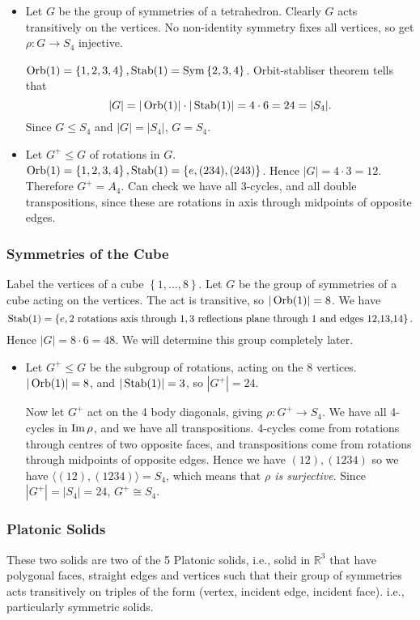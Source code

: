 \documentclass[a4paper]{article}
\begin{document}
\begin{itemize}
  \item Let $G$ be the group of symmetries of a tetrahedron. Clearly
    $G$ acts transitively on the vertices. No non-identity symmetry
    fixes all vertices, so get $ \rho:G \to S_4 $ injective.

    $ \operatorname{Orb}(1)=\left\{ 1,2,3,4 \right\}, \operatorname{Stab}(1)=\operatorname{Sym}\left\{ 2,3,4
    \right\} $. Orbit-stabliser theorem tells that
    \[
      |G|=|\operatorname{Orb}(1)|\cdot |\operatorname{Stab}(1)| = 4\cdot 6 = 24 = |S_4|
    .\]
    Since $ G \le S_4 $ and $ |G|=|S_4| $, $ G=S_4 $.
  \item Let $ G^+\le G $ of rotations in $G$. $ \operatorname{Orb}(1)=\left\{
    1,2,3,4 \right\}, \operatorname{Stab}(1)=\left\{ e, (234),(243) \right\} $.
    Hence $ |G|=4\cdot 3 = 12 $. Therefore $ G^+=A_4 $. Can check we
    have all 3-cycles, and all double transpositions, since these are
    rotations in axis through midpoints of opposite edges.
\end{itemize}
\subsubsection{Symmetries of the Cube}
Label the vertices of a cube $ \left\{ 1,\dots,8 \right\} $. Let $G$
be the group of symmetries of a cube acting on the vertices. The act
is transitive, so $ |\operatorname{Orb}(1)|=8 $. We have
\[
  \operatorname{Stab}(1)=\left\{ e,\text{2 rotations axis through 1}, \text{3
  reflections plane through 1 and edges 12,13,14} \right\}
.\]
Hence $ |G|=8\cdot 6=48. $ We will determine this group completely later.
\begin{itemize}
  \item Let $ G^+ \le G$ be the subgroup of rotations, acting on the
    8 vertices. $ |\operatorname{Orb}(1)|=8 $, and $ |\operatorname{Stab}(1)|=3 $, so $ |G^+|=24 $.

    Now let $ G^+ $ act on the 4 body diagonals, giving $ \rho:G^+\to
    S_4 $. We have all 4-cycles in $ \operatorname{Im} \rho $, and we have all
    transpositions. 4-cycles come from rotations through centres of
    two opposite faces, and transpositions come from rotations
    through midpoints of opposite edges. Hence we have $ (12),(1234)
    $ so we have $ \langle (12),(1234) \rangle =S_4 $, which means
    that \textit{$ \rho $ is surjective}. Since $ |G^+|=|S_4|=24 $, $
    G^+\cong S_4 $.
\end{itemize}
\subsubsection{Platonic Solids}
These two solids are two of the 5 Platonic solids, i.e., solid in $
\mathbb{R}^{3} $ that have polygonal faces, straight edges and
vertices such that their group of symmetries acts transitively on
triples of the form (vertex, incident edge, incident face). i.e.,
particularly symmetric solids.
\end{document}
